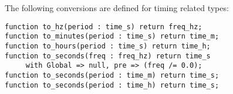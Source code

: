 \documentclass[10pt, openany]{book}
\begin{document}
The following conversions are defined for timing related types:
\begin{lstlisting}
function to_hz(period : time_s) return freq_hz;
function to_minutes(period : time_s) return time_m;
function to_hours(period : time_s) return time_h;
function to_seconds(freq : freq_hz) return time_s
     with Global => null, pre => (freq /= 0.0);
function to_seconds(period : time_m) return time_s;
function to_seconds(period : time_h) return time_s;
\end{lstlisting}
\end{document}
